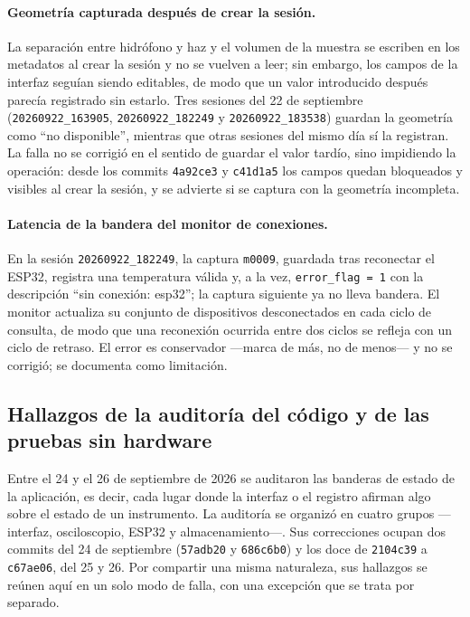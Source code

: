 \paragraph{Geometría capturada después de crear la sesión.} La
separación entre hidrófono y haz y el volumen de la muestra se escriben
en los metadatos al crear la sesión y no se vuelven a leer; sin
embargo, los campos de la interfaz seguían siendo editables, de modo
que un valor introducido después parecía registrado sin estarlo. Tres
sesiones del 22 de septiembre (\texttt{20260922\_163905},
\texttt{20260922\_182249} y \texttt{20260922\_183538}) guardan la
geometría como \enquote{no disponible}, mientras que otras sesiones del
mismo día sí la registran. La falla no se corrigió en el sentido de
guardar el valor tardío, sino impidiendo la operación: desde los
commits \texttt{4a92ce3} y \texttt{c41d1a5} los campos quedan
bloqueados y visibles al crear la sesión, y se advierte si se captura
con la geometría incompleta.

\paragraph{Latencia de la bandera del monitor de conexiones.} En la
sesión \texttt{20260922\_182249}, la captura \texttt{m0009}, guardada
tras reconectar el ESP32, registra una temperatura válida y, a la vez,
\texttt{error\_flag = 1} con la descripción \enquote{sin conexión:
esp32}; la captura siguiente ya no lleva bandera. El monitor actualiza
su conjunto de dispositivos desconectados en cada ciclo de consulta, de
modo que una reconexión ocurrida entre dos ciclos se refleja con un
ciclo de retraso. El error es conservador ---marca de más, no de
menos--- y no se corrigió; se documenta como limitación.

\subsection{Hallazgos de la auditoría del código y de las pruebas sin
hardware}
\label{sec:fallas_auditoria}

Entre el 24 y el 26 de septiembre de 2026 se auditaron las banderas de
estado de la aplicación, es decir, cada lugar donde la interfaz o el
registro afirman algo sobre el estado de un instrumento. La auditoría
se organizó en cuatro grupos ---interfaz, osciloscopio, ESP32 y
almacenamiento---. Sus correcciones ocupan dos commits del 24 de
septiembre (\texttt{57adb20} y \texttt{686c6b0}) y los doce de
\texttt{2104c39} a \texttt{c67ae06}, del 25 y 26. Por compartir una misma
naturaleza, sus hallazgos se reúnen aquí en un solo modo de falla, con
una excepción que se trata por separado.

